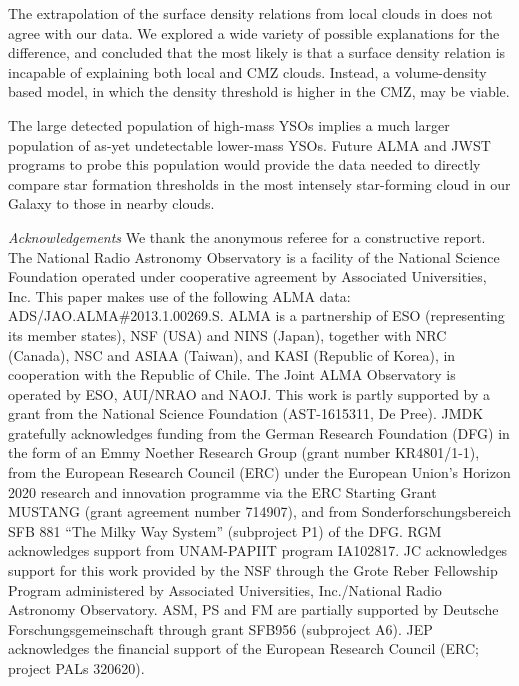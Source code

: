 \documentclass[twocolumn]{aastex61}
\begin{document}
The extrapolation of the surface density relations from local clouds in
\citet{Gutermuth2011a} does not agree with our data.  We explored a wide
variety of possible explanations for the difference, and concluded that the
most likely is that a surface density relation is incapable of explaining both
local and CMZ clouds.  Instead, a volume-density based model, in which the
density threshold is higher in the CMZ, may be viable.


The large detected population of high-mass YSOs implies a much larger
population of as-yet undetectable lower-mass YSOs.  Future ALMA and JWST
programs to probe this population would provide the data needed to directly
compare star formation thresholds in the most intensely star-forming cloud in
our Galaxy to those in nearby clouds.


\textit{Acknowledgements}
We thank the anonymous referee for a constructive report.
The National Radio Astronomy Observatory is a facility of the National Science
Foundation operated under cooperative agreement by Associated Universities,
Inc.
This paper makes use of the following ALMA data: ADS/JAO.ALMA\#2013.1.00269.S.
ALMA is a partnership of ESO (representing its member states), NSF (USA) and
NINS (Japan), together with NRC (Canada), NSC and ASIAA (Taiwan), and KASI
(Republic of Korea), in cooperation with the Republic of Chile. The Joint ALMA
Observatory is operated by ESO, AUI/NRAO and NAOJ.
This work is partly supported by a grant from the National Science Foundation
(AST-1615311, De Pree).  JMDK gratefully acknowledges funding from the German
Research Foundation (DFG) in the form of an Emmy Noether Research Group (grant
number KR4801/1-1), from the European Research Council (ERC) under the European
Union's Horizon 2020 research and innovation programme via the ERC Starting
Grant MUSTANG (grant agreement number 714907), and from Sonderforschungsbereich
SFB 881 ``The Milky Way System'' (subproject P1) of the DFG.
RGM acknowledges support from UNAM-PAPIIT program IA102817.
JC acknowledges support for this work provided by the NSF through the Grote
Reber Fellowship Program administered by Associated Universities, Inc./National
Radio Astronomy Observatory.
ASM, PS and FM are partially supported by Deutsche Forschungsgemeinschaft
through grant SFB956 (subproject A6).
JEP acknowledges the financial support of the European Research Council (ERC;
project PALs 320620).
\end{document}
